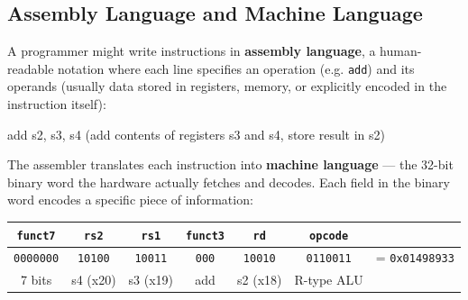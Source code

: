 \documentclass[9pt, a4paper]{extarticle}
\begin{document}

\subsection{Assembly Language and Machine Language}

A programmer might write instructions in \textbf{assembly language}, a human-readable notation where each line specifies an operation (e.g. \texttt{add}) and its operands (usually data stored in registers, memory, or explicitly encoded in the instruction itself):

\begin{center}\ttfamily\small
add s2, s3, s4 \quad\textrm{\normalfont\scriptsize\color{gray}(add contents of registers s3 and s4, store result in s2)}
\end{center}

The assembler translates each instruction into \textbf{machine language} --- the 32-bit binary word the hardware actually fetches and decodes. Each field in the binary word encodes a specific piece of information:

\begin{center}\small
\begin{tabular}{@{}c c c c c c l@{}}
    \toprule
    \texttt{funct7} & \texttt{rs2} & \texttt{rs1} & \texttt{funct3} & \texttt{rd} & \texttt{opcode} & \\
    \midrule
    \texttt{0000000} & \texttt{10100} & \texttt{10011} & \texttt{000} & \texttt{10010} & \texttt{0110011} & = \texttt{0x01498933} \\
    \scriptsize 7 bits & \scriptsize s4 (x20) & \scriptsize s3 (x19) & \scriptsize add & \scriptsize s2 (x18) & \scriptsize R-type ALU & \\
    \bottomrule
\end{tabular}
\end{center}
\end{document}
